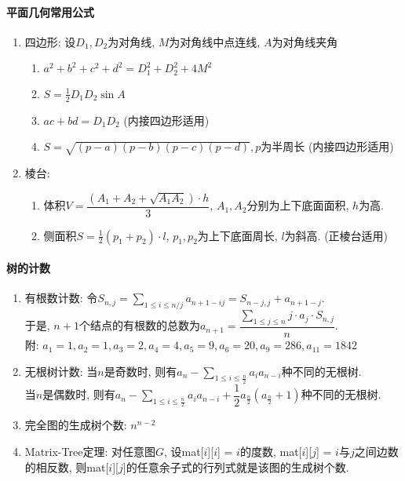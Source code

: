 \documentclass{article}
\begin{document}
\paragraph{平面几何常用公式}

\begin{enumerate}

    \item 四边形: 设$D_1, D_2$为对角线, $M$为对角线中点连线, $A$为对角线夹角 \begin{enumerate}
        \item $a^2 + b^2 + c^2 + d^2 = D_1^2 + D_2 ^ 2 + 4 M^2$
        \item $S = \frac{1}{2} D_1  D_2 \sin A$
        \item $ac + bd = D_1 D_2$ (内接四边形适用)
        \item $S = \sqrt{(p - a)(p - b)(p - c)(p - d)}, p$为半周长 (内接四边形适用)
    \end{enumerate}
    \item 棱台: \begin{enumerate}
        \item 体积$V = \dfrac{(A_1 + A_2 + \sqrt{A_1 A_2}) \cdot h}{3}$, $A_1, A_2$分别为上下底面面积, $h$为高.
        \item 侧面积$S = \frac{1}{2} (p_1 + p_2) \cdot l$, $p_1, p_2$为上下底面周长, $l$为斜高. (正棱台适用)
    \end{enumerate}
\end{enumerate}

\paragraph{树的计数}

\begin{enumerate}
    \item 有根数计数: 令$S_{n, j} = \sum\limits_{1 \le i \le n / j} a_{n + 1 - ij} = S_{n - j, j} + a_{n + 1 - j}$.\\
        于是, $n + 1$个结点的有根数的总数为$a_{n + 1} = \dfrac{\sum\limits_{1 \le j \le n} j \cdot a_j \cdot S_{n, j} }{n}$.\\
        附: $a_1 = 1, a_2 = 1, a_3 = 2, a_4 = 4, a_5 = 9, a_6 = 20, a_9 = 286, a_{11} = 1842$
    \item 无根树计数: 当$n$是奇数时, 则有$a_n - \sum\limits_{1 \le i \le \frac{n}{2}} a_i a_{n - i}$种不同的无根树.\\
        当$n$是偶数时, 则有$a_n - \sum\limits_{1 \le i \le \frac{n}{2}} a_i a_{n - i} + \dfrac{1}{2} a_\frac{n}{2} (a_\frac{n}{2} + 1)$种不同的无根树.
    \item 完全图的生成树个数: $n^{n - 2}$
    \item Matrix-Tree定理: 对任意图$G$, 设mat[$i$][$i$] = $i$的度数, mat[$i$][$j$] = $i$与$j$之间边数的相反数, 则mat[$i$][$j$]的任意余子式的行列式就是该图的生成树个数.
\end{enumerate}
\end{document}
